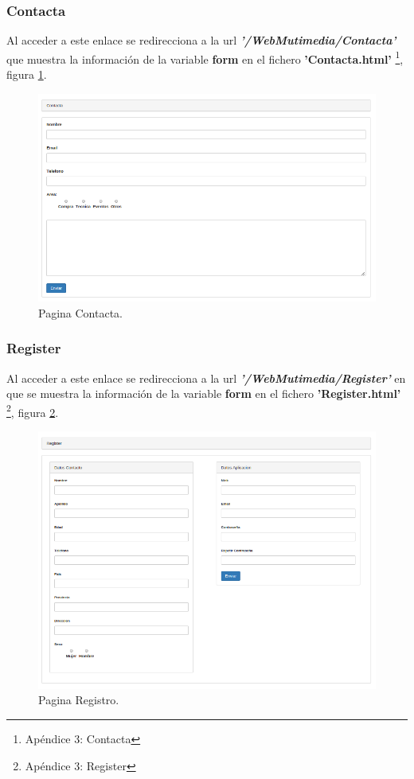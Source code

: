 \subsubsection*{Contacta}
Al acceder a este enlace se redirecciona a la url \textbf{\textit{'/WebMutimedia/Contacta'}} que muestra la información de la variable \textbf{form} en el fichero \textbf{'Contacta.html'} \footnote{Apéndice 3: Contacta}, figura \ref{fig:Form_Contacta}.
\begin{figure}[!h]
\begin{center}
   \includegraphics[width=0.5\linewidth]{Figures/Contacta}
	\decoRule
	\caption[Pagina Contacta]{Pagina Contacta.}
\label{fig:Form_Contacta}
\end{center}
\end{figure}
\subsubsection*{Register}
Al acceder a este enlace se redirecciona a la url \textbf{\textit{'/WebMutimedia/Register'}} en que se muestra la información de la variable \textbf{form} en el fichero \textbf{'Register.html'} \footnote{Apéndice 3: Register}, figura \ref{fig:Form_Register}.
\begin{figure}[!h]
\begin{center}
	\includegraphics[width=0.5\linewidth]{Figures/Register}
	\decoRule
	\caption[Pagina Registro]{Pagina Registro.}
\label{fig:Form_Register}
\end{center}
\end{figure}
